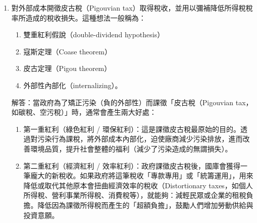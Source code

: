 \documentclass[12pt, a4paper]{article}
\begin{document}
\begin{enumerate}
    \item 對外部成本開徵皮古稅（Pigouvian tax）取得稅收，並用以彌補降低所得稅稅率所造成的稅收損失。這種想法一般稱為：
    \begin{enumerate}[label=\Alph*.]
        \item 雙重紅利假說（double-dividend hypothesis）
        \item 寇斯定理（Coase theorem）
        \item 皮古定理（Pigou theorem）
        \item 外部性內部化（internalizing）。
    \end{enumerate}
    解答：當政府為了矯正污染（負的外部性）而課徵「皮古稅（Pigouvian tax，如碳稅、空污稅）」時，通常會產生兩大好處：
    \begin{enumerate}
        \item 第一重紅利（綠色紅利 / 環保紅利）：這是課徵皮古稅最原始的目的。透過對污染行為課稅，將外部成本內部化，迫使廠商減少污染排放，進而改善環境品質，提升社會整體的福利（減少了污染造成的無謂損失）。
        \item 第二重紅利（經濟紅利 / 效率紅利）：政府課徵皮古稅後，國庫會獲得一筆龐大的新稅收。如果政府將這筆稅收「專款專用」或「統籌運用」，用來降低或取代其他原本會扭曲經濟效率的稅收（Distortionary taxes，如個人所得稅、營利事業所得稅、消費稅等），就能夠：減輕民眾或企業的租稅負擔。降低因為課徵所得稅而產生的「超額負擔」，鼓勵人們增加勞動供給與投資意願。
    \end{enumerate}


\end{enumerate}
\end{document}
